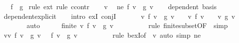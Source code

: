 \begin{isabellebody}
\ \ \ {\isachardoublequoteopen}f\ {\isacharequal}{\kern0pt}\ g{\isachardoublequoteclose}\isanewline
%
\isadelimproof
%
\endisadelimproof
%
\isatagproof
{}\isamarkupfalse%
\ {\isacharparenleft}{\kern0pt}rule\ ext{\isacharcomma}{\kern0pt}\ rule\ ccontr{\isacharparenright}{\kern0pt}\isanewline
\ \ \isamarkupfalse%
\ v\ \isamarkupfalse%
\ ne{\isacharcolon}{\kern0pt}\ {\isachardoublequoteopen}f\ v\ {\isasymnoteq}\ g\ v{\isachardoublequoteclose}\isanewline
\ \ \isamarkupfalse%
\ {\isachardoublequoteopen}dependent\ basis{\isachardoublequoteclose}\isanewline
\ \ \ \ \isamarkupfalse%
\ dependent{\isacharunderscore}{\kern0pt}explicit\isanewline
\ \ \isamarkupfalse%
\ {\isacharparenleft}{\kern0pt}intro\ exI\ conjI{\isacharparenright}{\kern0pt}\isanewline
\ \ \ \ \isamarkupfalse%
\ {\isacharasterisk}{\kern0pt}{\isacharcolon}{\kern0pt}\ {\isachardoublequoteopen}{\isacharbraceleft}{\kern0pt}v{\isachardot}{\kern0pt}\ f\ v\ {\isacharminus}{\kern0pt}\ g\ v\ {\isasymnoteq}\ {}{\isacharbraceright}{\kern0pt}\ {\isasymsubseteq}\ {\isacharbraceleft}{\kern0pt}v{\isachardot}{\kern0pt}\ f\ v\ {\isasymnoteq}\ {}{\isacharbraceright}{\kern0pt}\ {\isasymunion}\ {\isacharbraceleft}{\kern0pt}v{\isachardot}{\kern0pt}\ g\ v\ {\isasymnoteq}\ {}{\isacharbraceright}{\kern0pt}{\isachardoublequoteclose}\isanewline
\ \ \ \ \ \ \isamarkupfalse%
\ auto\isanewline
\ \ \ \ \isamarkupfalse%
\ {\isachardoublequoteopen}finite\ {\isacharbraceleft}{\kern0pt}v{\isachardot}{\kern0pt}\ f\ v\ {\isacharminus}{\kern0pt}\ g\ v\ {\isasymnoteq}\ {}{\isacharbraceright}{\kern0pt}{\isachardoublequoteclose}\isanewline
\ \ \ \ \ \ \isamarkupfalse%
\ {\isacharparenleft}{\kern0pt}rule\ finite{\isacharunderscore}{\kern0pt}subset{\isacharbrackleft}{\kern0pt}OF\ {\isacharasterisk}{\kern0pt}{\isacharbrackright}{\kern0pt}{\isacharparenright}{\kern0pt}\ simp\isanewline
\ \ \ \ \isamarkupfalse%
\ {\isachardoublequoteopen}{\isasymexists}v{\isasymin}{\isacharbraceleft}{\kern0pt}v{\isachardot}{\kern0pt}\ f\ v\ {\isacharminus}{\kern0pt}\ g\ v\ {\isasymnoteq}\ {}{\isacharbraceright}{\kern0pt}{\isachardot}{\kern0pt}\ f\ v\ {\isacharminus}{\kern0pt}\ g\ v\ {\isasymnoteq}\ {}{\isachardoublequoteclose}\isanewline
\ \ \ \ \ \ \isamarkupfalse%
\ {\isacharparenleft}{\kern0pt}rule\ bexI{\isacharbrackleft}{\kern0pt}of\ {\isacharunderscore}{\kern0pt}\ v{\isacharbrackright}{\kern0pt}{\isacharparenright}{\kern0pt}\ {\isacharparenleft}{\kern0pt}auto\ simp{\isacharcolon}{\kern0pt}\ ne{\isacharparenright}{\kern0pt}\isanewline

\end{isabellebody}
